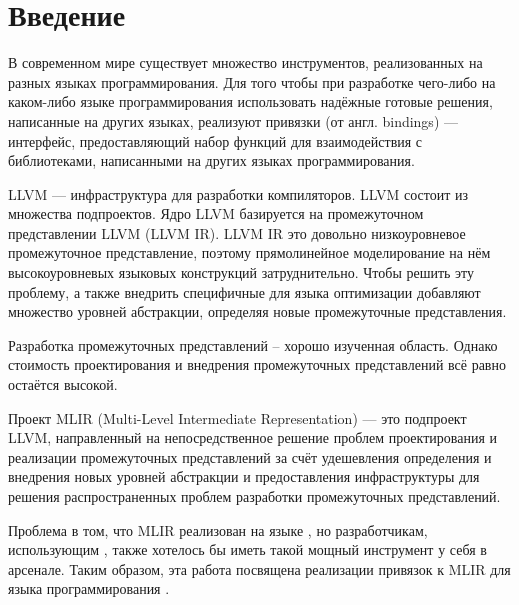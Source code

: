 
\section*{Введение}
\thispagestyle{withCompileDate}

В современном мире существует множество инструментов, реализованных на разных языках программирования. Для того чтобы при разработке чего-либо на каком-либо языке программирования использовать надёжные готовые решения, написанные на других языках, реализуют привязки (от англ. bindings) --- интерфейс, предоставляющий набор функций для взаимодействия с библиотеками, написанными на других языках программирования.

LLVM \cite{LLVM} --- инфраструктура для разработки компиляторов. LLVM состоит из множества подпроектов. Ядро LLVM базируется на промежуточном представлении LLVM (LLVM IR). LLVM IR это довольно низкоуровневое промежуточное представление, поэтому прямолинейное моделирование на нём высокоуровневых языковых конструкций затруднительно. Чтобы решить эту проблему, а также внедрить специфичные для языка оптимизации добавляют множество уровней абстракции, определяя новые промежуточные представления.

Разработка промежуточных представлений -- хорошо изученная область. Однако стоимость проектирования и внедрения промежуточных представлений всё равно остаётся высокой.

Проект MLIR \cite{MLIR} (Multi-Level Intermediate Representation) --- это подпроект LLVM, направленный на непосредственное решение проблем проектирования и реализации промежуточных представлений за счёт удешевления определения и внедрения новых уровней абстракции и предоставления инфраструктуры для решения распространенных проблем разработки промежуточных представлений.

Проблема в том, что MLIR реализован на языке \Cpp{}, но разработчикам, использующим \OCaml{}, также хотелось бы иметь такой мощный инструмент у себя в арсенале. Таким образом, эта работа посвящена реализации привязок к MLIR для языка программирования \OCaml{}.
